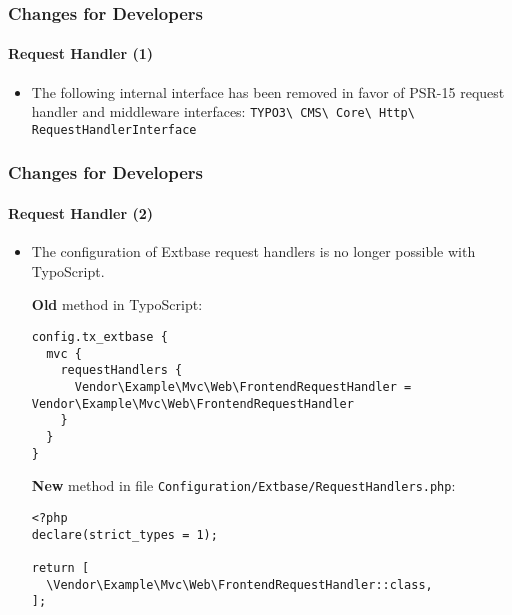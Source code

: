
\begin{frame}[fragile]
	\frametitle{Changes for Developers}
	\framesubtitle{Request Handler (1)}

	\begin{itemize}
		\item The following internal interface has been removed
			in favor of PSR-15 request handler and middleware interfaces:\newline
			\texttt{TYPO3\textbackslash
				CMS\textbackslash
				Core\textbackslash
				Http\textbackslash
				RequestHandlerInterface}

	\end{itemize}

\end{frame}


\begin{frame}[fragile]
	\frametitle{Changes for Developers}
	\framesubtitle{Request Handler (2)}

	\lstset{basicstyle=\tiny\ttfamily}

	\begin{itemize}
		\item The configuration of Extbase request handlers is no longer possible with TypoScript.

		\smaller\textbf{Old} method in TypoScript:\normalsize
\begin{lstlisting}
config.tx_extbase {
  mvc {
    requestHandlers {
      Vendor\Example\Mvc\Web\FrontendRequestHandler = Vendor\Example\Mvc\Web\FrontendRequestHandler
    }
  }
}
\end{lstlisting}

		\smaller\textbf{New} method in file \texttt{Configuration/Extbase/RequestHandlers.php}:\normalsize
\begin{lstlisting}
<?php
declare(strict_types = 1);

return [
  \Vendor\Example\Mvc\Web\FrontendRequestHandler::class,
];
\end{lstlisting}

	\end{itemize}

\end{frame}


